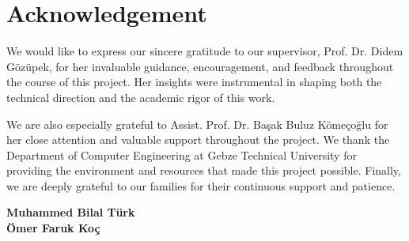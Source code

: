 \chapter*{Acknowledgement}

We would like to express our sincere gratitude to our supervisor, Prof. Dr. Didem Gözüpek, for her invaluable guidance, encouragement, and feedback throughout the course of this project. Her insights were instrumental in shaping both the technical direction and the academic rigor of this work.

We are also especially grateful to Assist. Prof. Dr. Başak Buluz Kömeçoğlu for her close attention and valuable support throughout the project. We thank the Department of Computer Engineering at Gebze Technical University for providing the environment and resources that made this project possible. Finally, we are deeply grateful to our families for their continuous support and patience.

\vspace{1cm}
\begin{flushright}
\textbf{Muhammed Bilal Türk} \\
\textbf{Ömer Faruk Koç}
\end{flushright}
\clearpage
